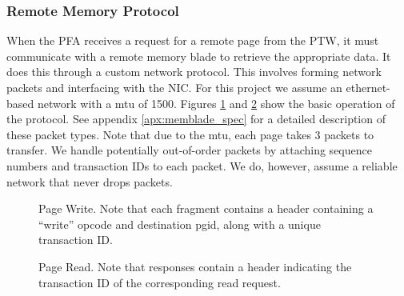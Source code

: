 \subsubsection{Remote Memory Protocol}
When the PFA receives a request for a remote page from the PTW, it must
communicate with a remote \gls{memory blade} to retrieve the appropriate data. It
does this through a custom network protocol. This involves forming network
packets and interfacing with the NIC. For this project we assume an
ethernet-based network with a \gls{mtu} of \SI{1500}{\byte}.
Figures \ref{fig:write_protocol} and \ref{fig:read_protocol} show the basic
operation of the protocol. See appendix \ref{apx:memblade_spec} for a detailed
description of these packet types. Note that due to the \gls{mtu}, each page takes 3
packets to transfer. We handle potentially out-of-order packets by attaching
sequence numbers and transaction IDs to each packet. We do, however, assume a
reliable network that never drops packets.

\begin{figure}[h]
    \centering
    \begin{sequencediagram}
    \end{sequencediagram}
    \caption{Page Write. Note that each fragment contains a header containing a
    ``write'' opcode and destination \gls{pgid}, along with a unique
    transaction ID.}
		\label{fig:write_protocol}
\end{figure} 
 
\begin{figure}[h]
    \centering
    \begin{sequencediagram}
    \end{sequencediagram}
		\caption{Page Read. Note that responses contain a header indicating the
    transaction ID of the corresponding read request.}
		\label{fig:read_protocol}
\end{figure} 


